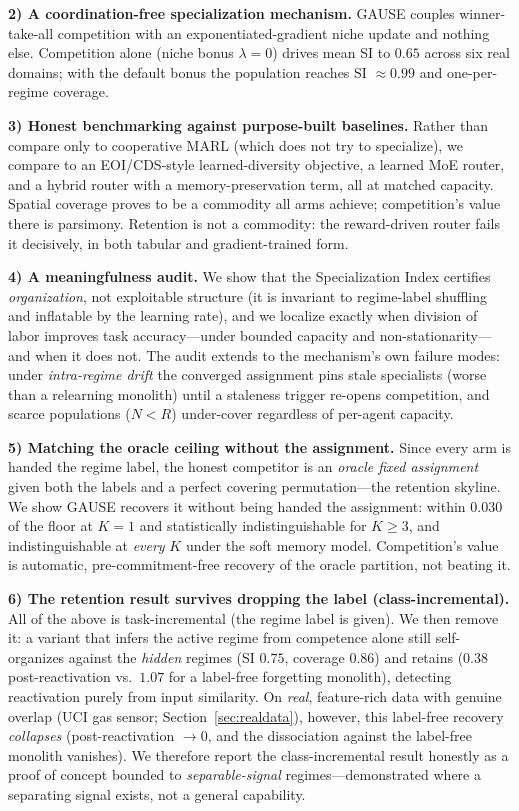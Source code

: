 \documentclass[10pt]{article}
\begin{document}
\textbf{2) A coordination-free specialization mechanism.} GAUSE couples
winner-take-all competition with an exponentiated-gradient niche update and
nothing else. Competition alone (niche bonus $\lambda=0$) drives mean SI to
$0.65$ across six real domains; with the default bonus the population reaches
SI $\approx 0.99$ and one-per-regime coverage.

\textbf{3) Honest benchmarking against purpose-built baselines.} Rather than
compare only to cooperative MARL (which does not try to specialize), we compare
to an EOI/CDS-style learned-diversity objective, a learned MoE router, and a
hybrid router with a memory-preservation term, all at matched capacity. Spatial
coverage proves to be a commodity all arms achieve; competition's value there is
parsimony. Retention is not a commodity: the reward-driven router fails it
decisively, in both tabular and gradient-trained form.

\textbf{4) A meaningfulness audit.} We show that the Specialization Index
certifies \emph{organization}, not exploitable structure (it is invariant to
regime-label shuffling and inflatable by the learning rate), and we localize
exactly when division of labor improves task accuracy---under bounded capacity
and non-stationarity---and when it does not. The audit extends to the mechanism's
own failure modes: under \emph{intra-regime drift} the converged assignment pins
stale specialists (worse than a relearning monolith) until a staleness trigger
re-opens competition, and scarce populations ($N<R$) under-cover regardless of
per-agent capacity.

\textbf{5) Matching the oracle ceiling without the assignment.} Since every arm is
handed the regime label, the honest competitor is an \emph{oracle fixed assignment}
given both the labels and a perfect covering permutation---the retention skyline. We
show GAUSE recovers it without being handed the assignment: within $0.030$ of the
floor at $K{=}1$ and statistically indistinguishable for $K\ge3$, and
indistinguishable at \emph{every} $K$ under the soft memory model. Competition's
value is automatic, pre-commitment-free recovery of the oracle partition, not
beating it.

\textbf{6) The retention result survives dropping the label (class-incremental).}
All of the above is task-incremental (the regime label is given). We then remove it:
a variant that infers the active regime from competence alone still self-organizes
against the \emph{hidden} regimes (SI $0.75$, coverage $0.86$) and retains
($0.38$ post-reactivation vs.\ $1.07$ for a label-free forgetting monolith),
detecting reactivation purely from input similarity. On \emph{real}, feature-rich
data with genuine overlap (UCI gas sensor; Section~\ref{sec:realdata}), however,
this label-free recovery \emph{collapses} (post-reactivation $\to 0$, and the
dissociation against the label-free monolith vanishes). We therefore report the
class-incremental result honestly as a proof of concept bounded to
\emph{separable-signal} regimes---demonstrated where a separating signal exists, not
a general capability.
\end{document}
